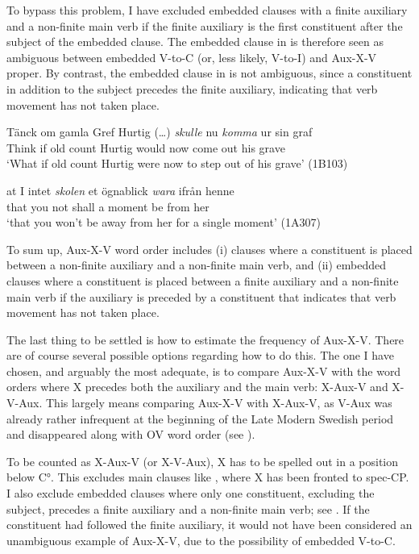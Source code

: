 \documentclass[output=paper, colorlinks, citecolor=brown]{langscibook}
\begin{document}
To bypass this problem, I have excluded embedded clauses with a finite auxiliary and a non-finite main verb if the finite auxiliary is the first constituent after the subject of the embedded clause. The embedded clause in  is therefore seen as ambiguous between embedded V-to-C (or, less likely, V-to-I) and Aux-X-V proper. By contrast, the embedded clause in  is not ambiguous, since a constituent in addition to the subject precedes the finite auxiliary, indicating that verb movement has not taken place.


\ea
\label{ex:sangfelt:24}
\ea\label{ex:sangfelt:24a}
\gll Tänck om gamla Gref {Hurtig (…)} \textit{skulle} {nu} \textit{komma} ur sin graf \\ %
 Think if old count Hurtig would now come out his grave\\
\glt ‘What if old count Hurtig were now to step out of his grave’ (1B103)

\ex\label{ex:sangfelt:24b}
\gll at I {intet} \textit{skolen} {et} {ögnablick} \textit{wara} ifrån henne \\
 that you not shall a moment be from her\\
\glt ‘that you won’t be away from her for a single moment’ (1A307)
\z
\z


To sum up, Aux-X-V word order includes (i) clauses where a constituent is placed between a non-finite auxiliary and a non-finite main verb, and (ii) embedded clauses where a constituent is placed between a finite auxiliary and a non-finite main verb if the auxiliary is preceded by a constituent that indicates that verb movement has not taken place.


The last thing to be settled is how to estimate the frequency of Aux-X-V. There are of course several possible options regarding how to do this. The one I have chosen, and arguably the most adequate, is to compare Aux-X-V with the word orders where X precedes both the auxiliary and the main verb: X-Aux-V and X-V-Aux. This largely means comparing Aux-X-V with X-Aux-V, as V-Aux was already rather infrequent at the beginning of the Late Modern Swedish period and disappeared along with OV word order (see \citealt{Platzack1983,Petzell2011,Sangfelt2019}).



To be counted as X-Aux-V (or X-V-Aux), X has to be spelled out in a position below C°. This excludes main clauses like , where X has been fronted to spec-CP. I also exclude embedded clauses where only one constituent, excluding the subject, precedes a finite auxiliary and a non-finite main verb; see . If the constituent had followed the finite auxiliary, it would not have been considered an unambiguous example of Aux-X-V, due to the possibility of embedded V-to-C.
\end{document}
